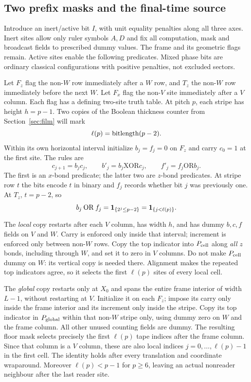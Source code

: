 \subsection{Two prefix masks and the final-time source}
Introduce an inert/active bit $I$, with unit equality penalties along
all three axes. Inert sites allow only ruler symbols $A,D$ and fix
all computation, mask and broadcast fields to prescribed dummy values.
The frame and its geometric flags remain. Active sites enable the
following predicates. Mixed phase bits are ordinary classical
configurations with positive penalties, not excluded sectors.

Let $F_z$ flag the non-$W$ row immediately after a $W$ row, and $T_z$
the non-$W$ row immediately before the next $W$. Let $F_x$ flag the
non-$V$ site immediately after a $V$ column. Each flag has a defining
two-site truth table. At pitch $p$, each stripe has height $h=p-1$.
Two copies of the Boolean thickness counter from
Section~\ref{sec:film} will mark
\[
 \ell(p)=\operatorname{bitlength}(p-2).
\]
Within its own horizontal interval initialize $b_j=f_j=0$ on $F_z$
and carry $c_0=1$ at the first site. The rules are
\begin{equation}\label{eq:bulk-thickness}
 c_{j+1}=b_jc_j,\qquad
 b'_j=b_j\mathbin{\mathrm{XOR}}c_j,\qquad
 f'_j=f_j\mathbin{\mathrm{OR}}b_j.
\end{equation}
The first is an $x$-bond predicate; the latter two are $z$-bond
predicates. At stripe row $t$ the bits encode $t$ in binary and $f_j$
records whether bit $j$ was previously one. At $T_z$, $t=p-2$, so
\begin{equation}\label{eq:bulk-prefix}
 b_j\mathbin{\mathrm{OR}}f_j
       =\mathbf 1_{\{2^j\leq p-2\}}=\mathbf 1_{\{j<\ell(p)\}}.
\end{equation}

The \emph{local} copy restarts after each $V$ column, has width
$h$, and has dummy $b,c,f$ fields on $V$ and $W$. Carry is enforced
only inside that interval; increment is enforced only between
non-$W$ rows. Copy the top indicator into $P_{\rm cell}$ along
\emph{all} $z$ bonds, including through $W$, and set it to zero in
$V$ columns. Do not make $P_{\rm cell}$ dummy on $W$: its vertical
copy is needed there. Alignment makes the repeated top indicators
agree, so it selects the first $\ell(p)$ sites of every local cell.

The \emph{global} copy restarts only at $X_0$ and spans the entire
frame interior of width $L-1$, without restarting at $V$. Initialize
it on each $F_z$; impose its carry only inside the frame interior
and its increment only inside the stripe. Copy its top indicator in
$P_{\rm global}$ within that non-$W$ stripe only, using dummy zero
on $W$ and the frame column. All other unused counting fields are
dummy. The resulting floor mask selects precisely the first
$\ell(p)$ tape indices after the frame column. Since that column
is a $V$ column, these are also local indices $j=0,\ldots,\ell(p)-1$
in the first cell. The identity holds after every translation and
coordinate wraparound. Moreover $\ell(p)<p-1$ for $p\geq6$,
leaving an actual nonreader neighbour after the last reader site.

